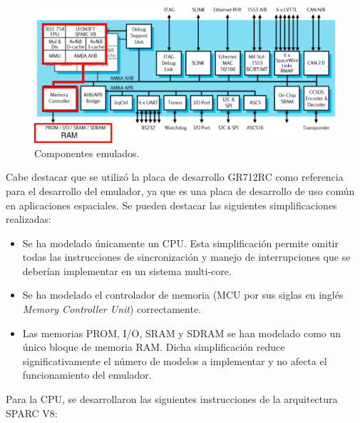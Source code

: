\begin{figure}[htbp]
	\centering
	\includegraphics[width=1\textwidth]{./Figures/componentes_desarrollados}
	\caption{Componentes emulados.}
	\label{fig:componentes_desarrollados}
\end{figure}
\newpage

Cabe destacar que se utilizó la placa de desarrollo GR712RC como referencia para el desarrollo del emulador, ya que es una placa de desarrollo de uso común en aplicaciones espaciales. Se pueden destacar las siguientes simplificaciones realizadas:

\begin{itemize}
\item Se ha modelado únicamente un CPU. Esta simplificación permite omitir todas las instrucciones de sincronización y manejo de interrupciones que se deberían implementar en un sistema multi-core.
\item Se ha modelado el controlador de memoria (MCU por sus siglas en inglés \textit{Memory Controller Unit}) correctamente.
\item Las memorias PROM, I/O, SRAM y SDRAM se han modelado como un único bloque de memoria RAM. Dicha simplificación reduce significativamente el número de modelos a implementar y no afecta el funcionamiento del emulador.
\end{itemize}


Para la CPU, se desarrollaron las siguientes instrucciones de la arquitectura SPARC V8:

